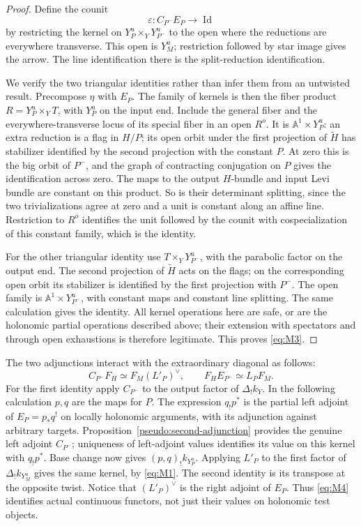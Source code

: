 \begin{proof}
Define the counit
\[
 \varepsilon:C_{P^-}E_P\longrightarrow\operatorname{Id}
\]
by restricting the kernel on $Y_P^u\times_Y Y_{P^-}^u$ to the open where the
reductions are everywhere transverse.  This open is $Y_M^u$; restriction
followed by star image gives the arrow.  The line identification there is
the split-reduction identification.

We verify the two triangular identities rather than infer them from an
untwisted result.  Precompose $\eta$ with $E_P$.  The family of kernels is
then the fiber product $R=Y_P^u\times_YT$, with $Y_P^u$ on the input end.
Include the general fiber and the everywhere-transverse locus of its
special fiber in an open $R^o$.  It is $\mathbb A^1\times Y_P^u$: an extra
reduction is a flag in $H/P$; its open orbit under the first projection of
$\widetilde H$ has stabilizer identified by the second projection with the
constant $P$.  At zero this is the big orbit of $P^-$, and the graph of
contracting conjugation on $P$ gives the identification across zero.
The maps to the output $H$-bundle and input Levi bundle are constant on
this product.  So is their determinant splitting, since the two
trivializations agree at zero and a unit is constant along an affine line.
Restriction to $R^o$ identifies the unit followed by the counit with
cospecialization of this constant family, which is the identity.

For the other triangular identity use
$T\times_Y Y_{P^-}^u$, with the parabolic factor on the output end.  The
second projection of $\widetilde H$ acts on the flags; on the corresponding
open orbit its stabilizer is identified by the first projection with
$P^-$.  The open family is $\mathbb A^1\times Y_{P^-}^u$, with constant maps
and constant line splitting.  The same calculation gives the identity.
All kernel operations here are safe, or are the holonomic partial
operations described above; their extension with spectators and through
open exhaustions is therefore legitimate.  This proves \eqref{eq:M3}.
\end{proof}

The two adjunctions interact with the extraordinary diagonal as follows:
\begin{equation}\label{eq:M4}
 C_{P^-}F_H\simeq F_M(L'_P)^\vee,
 \qquad F_HE_{P^-}\simeq L_PF_M.
\end{equation}
For the first identity apply $C_{P^-}$ to the output factor of
$\Delta_!k_Y$.  In the following calculation $p,q$ are the maps for $P$.
The expression $q_!p^*$ is the partial left adjoint of $E_P=p_*q^!$
on locally holonomic arguments, with its adjunction against arbitrary
targets.  Proposition~\ref{pseudo:second-adjunction} provides the genuine
left adjoint $C_{P^-}$; uniqueness of left-adjoint values identifies its
value on this kernel with $q_!p^*$.  Base change now gives
$(p,q)_!k_{Y_P^u}$.  Applying $L'_P$ to the first factor of
$\Delta_!k_{Y_M^u}$ gives the same kernel, by \eqref{eq:M1}.
The second identity is its transpose at the opposite twist.  Notice that
$(L'_P)^\vee$ is the right adjoint of $E_P$.  Thus \eqref{eq:M4} identifies
actual continuous functors, not just their values on holonomic test objects.

